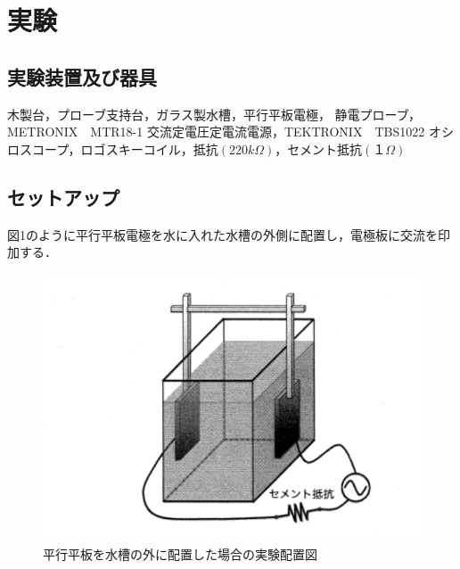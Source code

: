 
\section{実験}

\subsection{実験装置及び器具}
木製台，プローブ支持台，ガラス製水槽，平行平板電極，
静電プローブ，METRONIX　MTR18-1 交流定電圧定電流電源，TEKTRONIX　TBS1022
オシロスコープ，ロゴスキーコイル，抵抗$(220\si{k\Omega})$，セメント抵抗$(１\si{\Omega})$

\subsection{セットアップ}
図1のように平行平板電極を水に入れた水槽の外側に配置し，電極板に交流を印加する．
\begin{figure}[H]
    \centering
    \includegraphics[scale=0.75]{figure1.pdf}
    \caption{平行平板を水槽の外に配置した場合の実験配置図}
\end{figure}

\newpage


